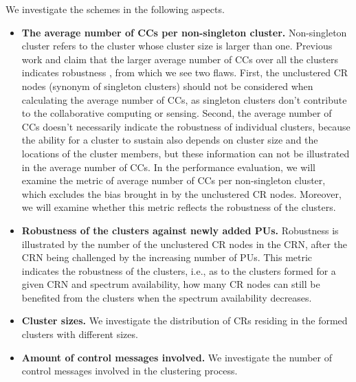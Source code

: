 \documentclass[times]{ettauth}
\newcommand{\ie}{i.e., }
\theoremstyle{mytheoremstyle}
\theoremstyle{mytheoremstyle}
\theoremstyle{mytheoremstyle}
\begin{document}
We investigate the schemes in the following aspects.

\begin{itemize}
\item \textbf{The average number of CCs per non-singleton cluster.}
Non-singleton cluster refers to the cluster whose cluster size is larger than one.
Previous work \cite{LIU_TMC11_2} and \cite{Li11_ROSS} claim that the larger average number of CCs over all the clusters indicates robustness , from which we see two flaws.
First, the unclustered CR nodes (synonym of singleton clusters) should not be considered when calculating the average number of CCs, as singleton clusters don't contribute to the collaborative computing or sensing.
Second, the average number of CCs doesn't necessarily indicate the robustness of individual clusters, because the ability for a cluster to sustain also depends on cluster size and the locations of the cluster members, but these information can not be illustrated in the average number of CCs.
In the performance evaluation, we will examine the metric of average number of CCs per non-singleton cluster, which excludes the bias brought in by the unclustered CR nodes.
Moreover, we will examine whether this metric reflects the robustness of the clusters.


\item \textbf{Robustness of the clusters against newly added PUs.}
Robustness is illustrated by the number of the unclustered CR nodes in the CRN, after the CRN being challenged by the increasing number of PUs.
This metric indicates the robustness of the clusters, \ie as to the clusters formed for a given CRN and spectrum availability, how many CR nodes can still be benefited from the clusters when the spectrum availability decreases.

\item \textbf{Cluster sizes.}
We investigate the distribution of CRs residing in the formed clusters with different sizes.



\item \textbf{Amount of control messages involved.}
We investigate the number of control messages involved in the clustering process.


\end{itemize}
\end{document}
